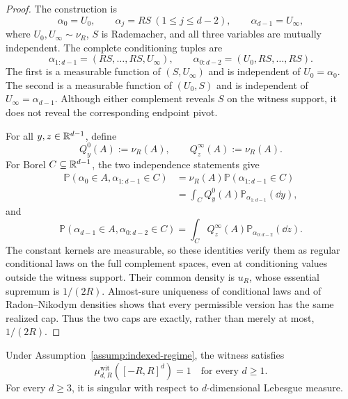 \begin{proof}
The construction is
\[
\alpha_0=U_0,\qquad
\alpha_j=RS\ (1\leq j\leq d-2),\qquad
\alpha_{d-1}=U_\infty,
\]
where $U_0,U_\infty\sim\nu_R$, $S$ is Rademacher, and all three variables
are mutually independent.  The complete conditioning tuples are
\[
\alpha_{1:d-1}=(RS,\ldots,RS,U_\infty),\qquad
\alpha_{0:d-2}=(U_0,RS,\ldots,RS).
\]
The first is a measurable function of $(S,U_\infty)$ and is independent of
$U_0=\alpha_0$.  The second is a measurable function of $(U_0,S)$ and is
independent of $U_\infty=\alpha_{d-1}$.  Although either complement reveals
$S$ on the witness support, it does not reveal the corresponding endpoint
pivot.

For all $y,z\in\mathbb{R}^{d-1}$, define
\[
Q^0_y(A):=\nu_R(A),\qquad Q^\infty_z(A):=\nu_R(A).
\]
For Borel $C\subseteq\mathbb{R}^{d-1}$, the two independence statements give
\[
\begin{aligned}
\mathbb P(\alpha_0\in A,\alpha_{1:d-1}\in C)
&=\nu_R(A)\mathbb P(\alpha_{1:d-1}\in C)\\
&=\int_CQ^0_y(A)\mathbb P_{\alpha_{1:d-1}}(\dd y),
\end{aligned}
\]
and
\[
\mathbb P(\alpha_{d-1}\in A,\alpha_{0:d-2}\in C)
=\int_CQ^\infty_z(A)\mathbb P_{\alpha_{0:d-2}}(\dd z).
\]
The constant kernels are measurable, so these identities verify them as
regular conditional laws on the full complement spaces, even at conditioning
values outside the witness support.  Their common density is $u_R$, whose
essential supremum is $1/(2R)$.  Almost-sure uniqueness of conditional laws
\cite[Theorem~6.3]{Kallenberg2002} and of Radon--Nikodym densities
\cite[Theorem~3.8]{Folland1999} shows that every permissible version has the
same realized cap.  Thus the two caps are exactly, rather than merely at
most, $1/(2R)$.
\end{proof}

\begin{proposition}
\label{prop:witness-support-singularity}
Under Assumption~\ref{assump:indexed-regime}, the witness satisfies
\[
\mu^{\mathrm{wit}}_{d,R}([-R,R]^d)=1
\quad\text{for every }d\geq1.
\]
For every $d\geq3$, it is singular with respect to $d$-dimensional Lebesgue
measure.
\end{proposition}

